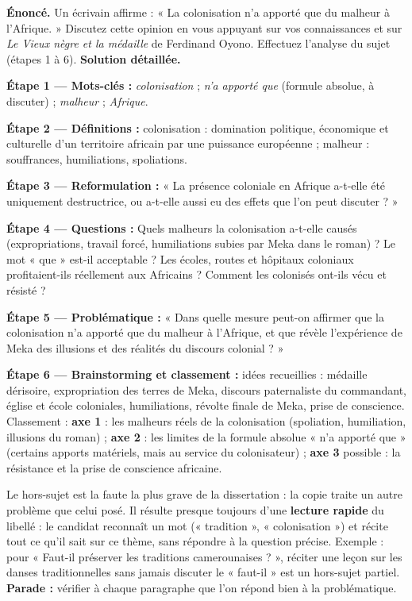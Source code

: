\documentclass[11pt]{article}
\newcommand{\cle}[1]{{\popxbold\color{popdark}#1}}
\newcounter{popsec}
\newcounter{popsub}
\newcommand{\courssub}[1]{%
  \stepcounter{popsub}%
  \par\vspace{9pt}\noindent{\popxbold\fontsize{11.5}{13}\selectfont\color{popink}{\color{poporange}\thepopsec.\thepopsub}\hspace{6pt}#1}\par\nopagebreak\vspace{4pt}
}
\begin{document}
\begin{exoresolu}
\textbf{Énoncé.} Un écrivain affirme : « La colonisation n'a apporté que du malheur à l'Afrique. » Discutez cette opinion en vous appuyant sur vos connaissances et sur \emph{Le Vieux nègre et la médaille} de Ferdinand Oyono. Effectuez l'analyse du sujet (étapes 1 à 6).
\tcblower
\textbf{Solution détaillée.}

\textbf{Étape 1 — Mots-clés :} \emph{colonisation} ; \emph{n'a apporté que} (formule absolue, à discuter) ; \emph{malheur} ; \emph{Afrique}.

\textbf{Étape 2 — Définitions :} colonisation : domination politique, économique et culturelle d'un territoire africain par une puissance européenne ; malheur : souffrances, humiliations, spoliations.

\textbf{Étape 3 — Reformulation :} « La présence coloniale en Afrique a-t-elle été uniquement destructrice, ou a-t-elle aussi eu des effets que l'on peut discuter ? »

\textbf{Étape 4 — Questions :} Quels malheurs la colonisation a-t-elle causés (expropriations, travail forcé, humiliations subies par Meka dans le roman) ? Le mot « que » est-il acceptable ? Les écoles, routes et hôpitaux coloniaux profitaient-ils réellement aux Africains ? Comment les colonisés ont-ils vécu et résisté ?

\textbf{Étape 5 — Problématique :} « Dans quelle mesure peut-on affirmer que la colonisation n'a apporté que du malheur à l'Afrique, et que révèle l'expérience de Meka des illusions et des réalités du discours colonial ? »

\textbf{Étape 6 — Brainstorming et classement :} idées recueillies : médaille dérisoire, expropriation des terres de Meka, discours paternaliste du commandant, église et école coloniales, humiliations, révolte finale de Meka, prise de conscience. Classement : \textbf{axe 1} : les malheurs réels de la colonisation (spoliation, humiliation, illusions du roman) ; \textbf{axe 2} : les limites de la formule absolue « n'a apporté que » (certains apports matériels, mais au service du colonisateur) ; \textbf{axe 3} possible : la résistance et la prise de conscience africaine.
\end{exoresolu}

\courssub{Le piège majeur : le hors-sujet}

\begin{attention}
Le \cle{hors-sujet} est la faute la plus grave de la dissertation : la copie traite un autre problème que celui posé. Il résulte presque toujours d'une \textbf{lecture rapide} du libellé : le candidat reconnaît un mot (« tradition », « colonisation ») et récite tout ce qu'il sait sur ce thème, sans répondre à la question précise. Exemple : pour « Faut-il préserver les traditions camerounaises ? », réciter une leçon sur les danses traditionnelles sans jamais discuter le « faut-il » est un hors-sujet partiel. \textbf{Parade :} vérifier à chaque paragraphe que l'on répond bien à la problématique.
\end{attention}
\end{document}
